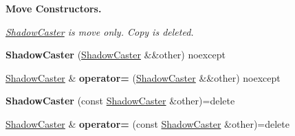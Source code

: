 \begin{Indent}\textbf{ Move Constructors.}\par
{\em \hyperlink{classblaze_1_1ShadowCaster}{Shadow\+Caster} is move only. Copy is deleted. }\begin{DoxyCompactItemize}
\item 
\mbox{\label{classblaze_1_1ShadowCaster_aaf74fec6fba452e70c1aa45ba7548cb5}} 
{\bfseries Shadow\+Caster} (\hyperlink{classblaze_1_1ShadowCaster}{Shadow\+Caster} \&\&other) noexcept
\item 
\mbox{\label{classblaze_1_1ShadowCaster_a07501453e0a3aaf9f337e2e299095b26}} 
\hyperlink{classblaze_1_1ShadowCaster}{Shadow\+Caster} \& {\bfseries operator=} (\hyperlink{classblaze_1_1ShadowCaster}{Shadow\+Caster} \&\&other) noexcept
\item 
\mbox{\label{classblaze_1_1ShadowCaster_a31244d0eaf3e647a04e9579d5be1014d}} 
{\bfseries Shadow\+Caster} (const \hyperlink{classblaze_1_1ShadowCaster}{Shadow\+Caster} \&other)=delete
\item 
\mbox{\label{classblaze_1_1ShadowCaster_ad15ab816ca0ca7cb9e64369d9434453f}} 
\hyperlink{classblaze_1_1ShadowCaster}{Shadow\+Caster} \& {\bfseries operator=} (const \hyperlink{classblaze_1_1ShadowCaster}{Shadow\+Caster} \&other)=delete
\end{DoxyCompactItemize}
\end{Indent}
